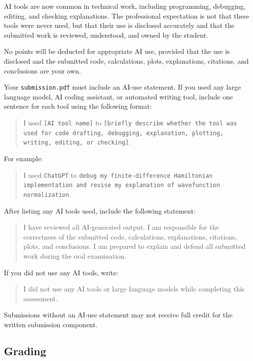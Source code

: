 AI tools are now common in technical work, including programming, debugging, editing, and checking explanations. The professional expectation is not that these tools were never used, but that their use is disclosed accurately and that the submitted work is reviewed, understood, and owned by the student.

No points will be deducted for appropriate AI use, provided that the use is disclosed and the submitted code, calculations, plots, explanations, citations, and conclusions are your own.

Your \texttt{submission.pdf} must include an AI-use statement. If you used any large language model, AI coding assistant, or automated writing tool, include one sentence for each tool using the following format:

\begin{quote}
I used \texttt{[AI tool name]} to \texttt{[briefly describe whether the tool was used for code drafting, debugging, explanation, plotting, writing, editing, or checking]}.
\end{quote}

For example:

\begin{quote}
I used \texttt{ChatGPT} to \texttt{debug my finite-difference Hamiltonian implementation and revise my explanation of wavefunction normalization}.
\end{quote}

After listing any AI tools used, include the following statement:

\begin{quote}
I have reviewed all AI-generated output. I am responsible for the correctness of the submitted code, calculations, explanations, citations, plots, and conclusions. I am prepared to explain and defend all submitted work during the oral examination.
\end{quote}

If you did not use any AI tools, write:

\begin{quote}
I did not use any AI tools or large language models while completing this assessment.
\end{quote}

Submissions without an AI-use statement may not receive full credit for the written submission component.
\subsection{Grading}

